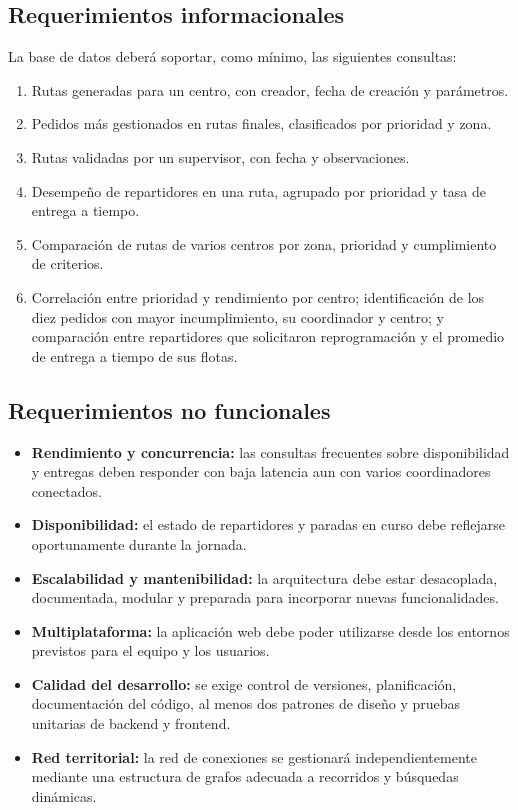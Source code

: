 \documentclass[12pt,a4paper]{article}
\begin{document}
\subsection{Requerimientos informacionales}
La base de datos deberá soportar, como mínimo, las siguientes consultas:
\begin{enumerate}
\item Rutas generadas para un centro, con creador, fecha de creación y parámetros.
\item Pedidos más gestionados en rutas finales, clasificados por prioridad y zona.
\item Rutas validadas por un supervisor, con fecha y observaciones.
\item Desempeño de repartidores en una ruta, agrupado por prioridad y tasa de entrega a tiempo.
\item Comparación de rutas de varios centros por zona, prioridad y cumplimiento de criterios.
\item Correlación entre prioridad y rendimiento por centro; identificación de los diez pedidos con mayor incumplimiento, su coordinador y centro; y comparación entre repartidores que solicitaron reprogramación y el promedio de entrega a tiempo de sus flotas.
\end{enumerate}

\subsection{Requerimientos no funcionales}
\begin{itemize}
\item \textbf{Rendimiento y concurrencia:} las consultas frecuentes sobre disponibilidad y entregas deben responder con baja latencia aun con varios coordinadores conectados.
\item \textbf{Disponibilidad:} el estado de repartidores y paradas en curso debe reflejarse oportunamente durante la jornada.
\item \textbf{Escalabilidad y mantenibilidad:} la arquitectura debe estar desacoplada, documentada, modular y preparada para incorporar nuevas funcionalidades.
\item \textbf{Multiplataforma:} la aplicación web debe poder utilizarse desde los entornos previstos para el equipo y los usuarios.
\item \textbf{Calidad del desarrollo:} se exige control de versiones, planificación, documentación del código, al menos dos patrones de diseño y pruebas unitarias de backend y frontend.
\item \textbf{Red territorial:} la red de conexiones se gestionará independientemente mediante una estructura de grafos adecuada a recorridos y búsquedas dinámicas.
\end{itemize}
\end{document}
